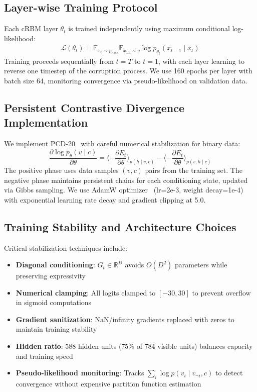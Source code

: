 \documentclass[11pt]{article}
\begin{document}
\subsection{Layer-wise Training Protocol}
Each cRBM layer $\theta_t$ is trained independently using maximum conditional log-likelihood:
\begin{align}
\mathcal{L}(\theta_t) = \mathbb{E}_{x_0\sim p_{\text{data}}} \mathbb{E}_{x_{1:t}\sim q} \log p_{\theta_t}(x_{t-1}\mid x_t)
\end{align}
Training proceeds sequentially from $t=T$ to $t=1$, with each layer learning to reverse one timestep of the corruption process. We use 160 epochs per layer with batch size 64, monitoring convergence via pseudo-likelihood on validation data.

\subsection{Persistent Contrastive Divergence Implementation}
We implement PCD-20~\cite{tieleman2008} with careful numerical stabilization for binary data:
\begin{equation}
\frac{\partial \log p_\theta(v \mid c)}{\partial \theta} = \langle -\frac{\partial E_t}{\partial \theta} \rangle_{p(h \mid v, c)} - \langle -\frac{\partial E_t}{\partial \theta} \rangle_{p(v,h \mid c)}
\end{equation}
The positive phase uses data samples $(v, c)$ pairs from the training set. The negative phase maintains persistent chains for each conditioning state, updated via Gibbs sampling. We use AdamW optimizer~\cite{kingma2014} (lr=2e-3, weight decay=1e-4) with exponential learning rate decay and gradient clipping at 5.0.

\subsection{Training Stability and Architecture Choices}
Critical stabilization techniques include:
\begin{itemize}
    \item \textbf{Diagonal conditioning}: $G_t \in \mathbb{R}^{D}$ avoids $O(D^2)$ parameters while preserving expressivity
    \item \textbf{Numerical clamping}: All logits clamped to $[-30, 30]$ to prevent overflow in sigmoid computations
    \item \textbf{Gradient sanitization}: NaN/infinity gradients replaced with zeros to maintain training stability
    \item \textbf{Hidden ratio}: 588 hidden units (75\% of 784 visible units) balances capacity and training speed
    \item \textbf{Pseudo-likelihood monitoring}: Tracks $\sum_i \log p(v_i \mid v_{\neg i}, c)$ to detect convergence without expensive partition function estimation
\end{itemize}
\end{document}
